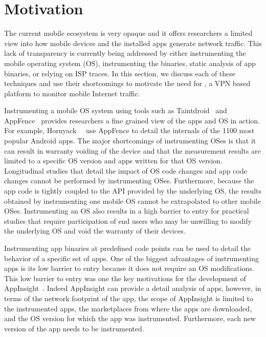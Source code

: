 \section{Motivation}
\label{sec:motivation}

The current mobile ecosystem is very opaque and it offers researchers a limited view into how mobile devices and the installed apps generate network traffic. 
This lack of transparency is currently being addressed by either instrumenting the mobile operating system (OS), instrumenting the binaries, static analysis of app binaries, or relying on ISP traces. 
In this section, we discuss each of these techniques and use their  shortcomings to motivate the need for \platname, a VPN based platform to monitor mobile Internet traffic.      

Instrumenting a mobile OS system using tools such as Taintdroid~\cite{enck:taintdroid} and AppFence~\cite{hornyack:appfence} provides researchers a fine grained view of the apps and OS in action. 
For example, Hornyack~\etal~\cite{hornyack:appfence} use AppFence to detail the internals of the 1100 most popular Android apps. 
The major shortcomings of instrumenting OSes is that it can result in warranty voiding of the device and that the measurement results are limited to a specific OS version and apps written for that OS version.
Longitudinal studies that detail the impact of OS code changes and app code changes cannot be performed by instrumenting OSes.
Furthermore, because the app code is tightly coupled to the API provided by the underlying OS, the results obtained by instrumenting  one mobile OS cannot be extrapolated to other mobile OSes. 
Instrumenting an OS also results in a high barrier to entry for practical studies that require participation of end users  who may be unwilling to modify the underlying OS and void the warranty of their devices. 

Instrumenting app binaries at predefined code points can be used to detail the behavior of a specific set of apps. 
One of the biggest advantages of  instrumenting apps is its low barrier to entry because it does not require an OS modifications. 
This low barrier to entry was one the key motivations for the development of AppInsight~\cite{ravindranath:appinsight}.
Indeed AppInsight can provide a detail analysis of apps, however, in terms of the network footprint of the app, the scope of AppInsight is limited to the instrumented apps, the marketplaces from where the apps are downloaded, and the OS version for which the app was instrumented.
Furthermore, each new version of the app needs to be instrumented.

